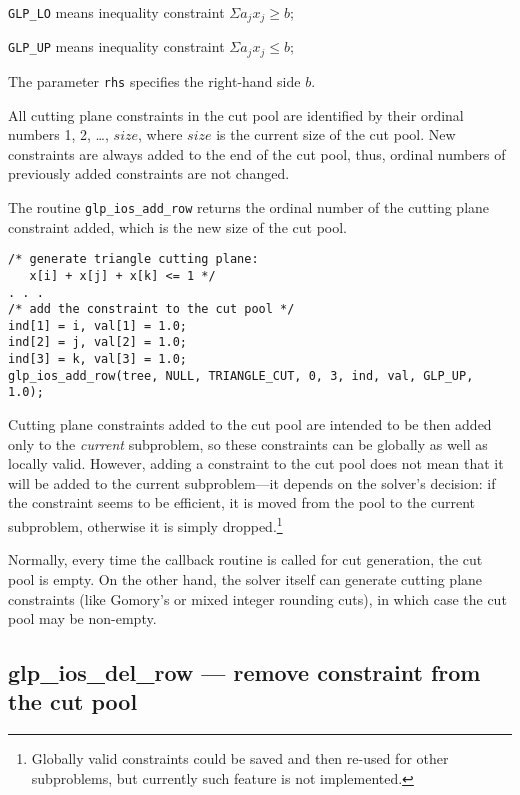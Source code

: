 \verb|GLP_LO| means inequality constraint $\Sigma a_jx_j\geq b$;

\verb|GLP_UP| means inequality constraint $\Sigma a_jx_j\leq b$;

\newpage

The parameter \verb|rhs| specifies the right-hand side $b$.

All cutting plane constraints in the cut pool are identified by their
ordinal numbers 1, 2, \dots, $size$, where $size$ is the current size
of the cut pool. New constraints are always added to the end of the cut
pool, thus, ordinal numbers of previously added constraints are not
changed.

\returns

The routine \verb|glp_ios_add_row| returns the ordinal number of the
cutting plane constraint added, which is the new size of the cut pool.


\begin{verbatim}
/* generate triangle cutting plane:
   x[i] + x[j] + x[k] <= 1 */
. . .
/* add the constraint to the cut pool */
ind[1] = i, val[1] = 1.0;
ind[2] = j, val[2] = 1.0;
ind[3] = k, val[3] = 1.0;
glp_ios_add_row(tree, NULL, TRIANGLE_CUT, 0, 3, ind, val, GLP_UP, 1.0);
\end{verbatim}


Cutting plane constraints added to the cut pool are intended to be then
added only to the {\it current} subproblem, so these constraints can be
globally as well as locally valid. However, adding a constraint to the
cut pool does not mean that it will be added to the current
subproblem---it depends on the solver's decision: if the constraint
seems to be efficient, it is moved from the pool to the current
subproblem, otherwise it is simply dropped.\footnote{Globally valid
constraints could be saved and then re-used for other subproblems, but
currently such feature is not implemented.}

Normally, every time the callback routine is called for cut generation,
the cut pool is empty. On the other hand, the solver itself can
generate cutting plane constraints (like Gomory's or mixed integer
rounding cuts), in which case the cut pool may be non-empty.

\subsection{glp\_ios\_del\_row --- remove constraint from the cut pool}


